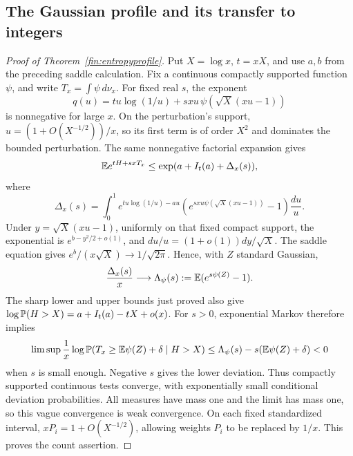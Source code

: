 \subsection{The Gaussian profile and its transfer to integers}\label{finapp:entropy-profile}
\begin{proof}[Proof of Theorem~\ref{fin:entropyprofile}]

Put $X=\log x$, $t=xX$, and use $a,b$ from the preceding saddle
calculation.  Fix a continuous compactly supported function $\psi$,
and write $T_x=\int\psi\,d\nu_x$.
For fixed real $s$, the exponent
\[
 q(u)=tu\log(1/u)+sxu\,\psi(\sqrt X(xu-1))
\]
is nonnegative for large $x$.  On the perturbation's support,
$u=(1+O(X^{-1/2}))/x$, so its first term is of order $X^2$
and dominates the bounded perturbation.  The same nonnegative
factorial expansion gives
\[
 \mathbb E e^{tH+sxT_x}\le \exp(a+I_t(a)+\Delta_x(s)),
\]
where
\[
 \Delta_x(s)=\int_0^1 e^{tu\log(1/u)-au}
        \left(e^{sxu\psi(\sqrt X(xu-1))}-1\right)\frac{du}{u}.
\]
Under $y=\sqrt X(xu-1)$, uniformly on that fixed compact support,
the exponential is $e^{b-y^2/2+o(1)}$, and
$du/u=(1+o(1))dy/\sqrt X$.
The saddle equation gives $e^b/(x\sqrt X)\to1/\sqrt{2\pi}$.
Hence, with $Z$ standard Gaussian,
\[
 \frac{\Delta_x(s)}x\longrightarrow
 \Lambda_\psi(s):=\mathbb E(e^{s\psi(Z)}-1).
\]
The sharp lower and upper bounds just proved also give
$\log\mathbb P(H>X)=a+I_t(a)-tX+o(x)$.
For $s>0$, exponential Markov therefore implies
\[
 \limsup\frac1x\log
 \mathbb P(T_x\ge \mathbb E\psi(Z)+\delta\mid H>X)
 \le\Lambda_\psi(s)-s(\mathbb E\psi(Z)+\delta)<0
\]
when $s$ is small enough.  Negative $s$ gives the lower deviation.
Thus compactly supported continuous tests converge, with exponentially
small conditional deviation probabilities.
All measures have mass one and the limit has mass one, so this vague
convergence is weak convergence.  On each fixed standardized interval,
$xP_i=1+O(X^{-1/2})$, allowing weights $P_i$ to be replaced by $1/x$.
This proves the count assertion.
\end{proof}
